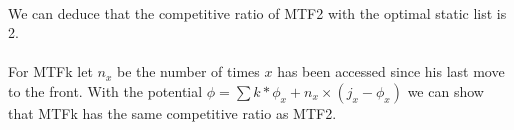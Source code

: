 \paragraph{}
We can deduce that the competitive ratio of MTF2 with the optimal static list is 2.

\paragraph{}For MTFk let $n_x$ be the number of times $x$ has been accessed since his last move to the front. With the potential $\phi = \sum{} k*\phi_x + n_x \times (j_x - \phi_x)$ we can show that MTFk has the same competitive ratio as MTF2.